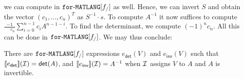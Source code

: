 we can compute in $\texttt{for}\text{-}\texttt{MATLANG}[f_/]$ as well. Hence, we can invert $S$ and obtain the vector $(c_1,\ldots,c_n)^T$ as $S^{-1}\cdot s$. To compute $A^{-1}$ it now suffices to compute
$\frac{-1}{\phantom{-1}c_n}\sum_{i=0}^{n-1}c_i A^{n-1-i}$. To find the determinant,
we compute $(-1)^nc_n$. All this can be done in $\texttt{for}\text{-}\texttt{MATLANG}[f_/]$.
We may thus conclude:
\begin{proposition}\label{prop:inverse}
    There are $\texttt{for}\text{-}\texttt{MATLANG}[f_/]$ expressions $e_{\mathsf{det}}(V)$ and $e_{\mathsf{inv}}(V)$ such that
    $\llbracket e_{\mathsf{det}} \rrbracket(\mathcal{I})=\mathsf{det}(A)$, and  
    $\llbracket e_{\mathsf{inv}} \rrbracket(\mathcal{I})=A^{-1}$ when $\mathcal{I}$ assigns $V$
    to $A$ and $A$ is invertible.
\end{proposition}


